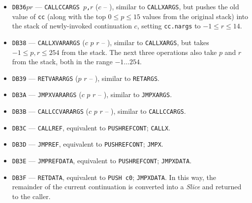 \documentclass[12pt,oneside]{article}
\begin{document}
\begin{itemize}
\item {\tt DB36$pr$} --- {\tt CALLCCARGS $p$,$r$} ($c$ -- ), similar to {\tt CALLXARGS}, but pushes the old value of {\tt cc} (along with the top $0\leq p\leq 15$ values from the original stack) into the stack of newly-invoked continuation $c$, setting {\tt cc.nargs} to $-1\leq r\leq 14$.
\item {\tt DB38} --- {\tt CALLXVARARGS} ($c$ $p$ $r$ -- ), similar to {\tt CALLXARGS}, but takes $-1\leq p,r\leq254$ from the stack. The next three operations also take $p$ and $r$ from the stack, both in the range $-1\ldots254$.
\item {\tt DB39} --- {\tt RETVARARGS} ($p$ $r$ -- ), similar to {\tt RETARGS}.
\item {\tt DB3A} --- {\tt JMPXVARARGS} ($c$ $p$ $r$ -- ), similar to {\tt JMPXARGS}.
\item {\tt DB3B} --- {\tt CALLCCVARARGS} ($c$ $p$ $r$ -- ), similar to {\tt CALLCCARGS}.
\item {\tt DB3C} --- {\tt CALLREF}, equivalent to {\tt PUSHREFCONT}; {\tt CALLX}.
\item {\tt DB3D} --- {\tt JMPREF}, equivalent to {\tt PUSHREFCONT}; {\tt JMPX}.
\item {\tt DB3E} --- {\tt JMPREFDATA}, equivalent to {\tt PUSHREFCONT}; {\tt JMPXDATA}.
\item {\tt DB3F} --- {\tt RETDATA}, equivalent to {\tt PUSH c0}; {\tt JMPXDATA}. In this way, the remainder of the current continuation is converted into a {\em Slice\/} and returned to the caller.
\end{itemize}
\end{document}
